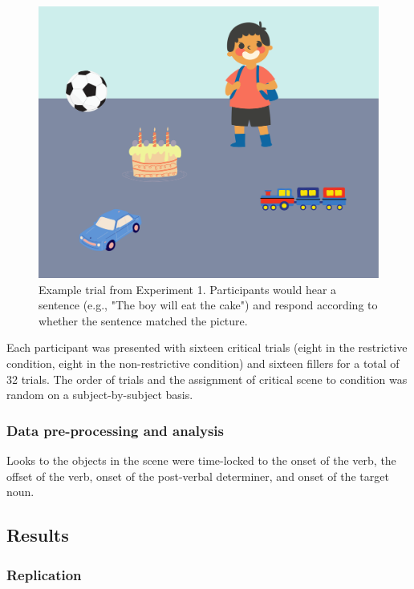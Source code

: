 \documentclass[
  man,floatsintext]{apa6}
\begin{document}
\begin{figure}
\includegraphics[width=6.67in]{group-a/E1-example-trial} \caption{Example trial from Experiment 1. Participants would hear a sentence (e.g., "The boy will eat the cake") and respond according to whether the sentence matched the picture.}\label{fig:E1-example-trial}
\end{figure}

Each participant was presented with sixteen critical trials (eight in
the restrictive condition, eight in the non-restrictive condition) and
sixteen fillers for a total of 32 trials. The order of trials and the
assignment of critical scene to condition was random on a
subject-by-subject basis.

\hypertarget{data-pre-processing-and-analysis}{%
\subsubsection{Data pre-processing and analysis}\label{data-pre-processing-and-analysis}}

Looks to the objects in the scene were time-locked to the onset of the
verb, the offset of the verb, onset of the post-verbal determiner, and
onset of the target noun.

\hypertarget{results}{%
\subsection{Results}\label{results}}

\hypertarget{replication}{%
\subsubsection{Replication}\label{replication}}
\end{document}
